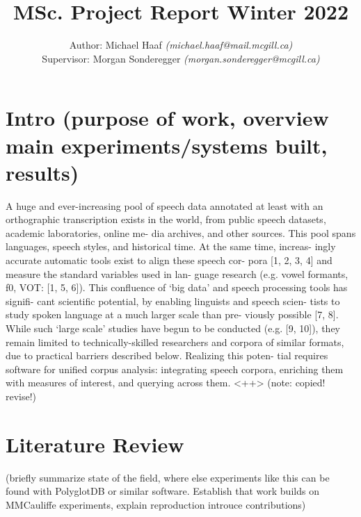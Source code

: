\documentclass[twoside,11pt]{article}
\begin{document}
\title{MSc. Project Report Winter 2022}
\author{Author: Michael Haaf \textit{(michael.haaf@mail.mcgill.ca)} \\ Supervisor: Morgan Sonderegger \textit{(morgan.sonderegger@mcgill.ca)}}

\maketitle


\section{Intro (purpose of work, overview main experiments/systems built, results)}

A huge and ever-increasing pool of speech data annotated at
least with an orthographic transcription exists in the world,
from public speech datasets, academic laboratories, online me-
dia archives, and other sources. This pool spans languages,
speech styles, and historical time. At the same time, increas-
ingly accurate automatic tools exist to align these speech cor-
pora [1, 2, 3, 4] and measure the standard variables used in lan-
guage research (e.g. vowel formants, f0, VOT: [1, 5, 6]). This
confluence of ‘big data’ and speech processing tools has signifi-
cant scientific potential, by enabling linguists and speech scien-
tists to study spoken language at a much larger scale than pre-
viously possible [7, 8]. While such ‘large scale’ studies have
begun to be conducted (e.g. [9, 10]), they remain limited to
technically-skilled researchers and corpora of similar formats,
due to practical barriers described below. Realizing this poten-
tial requires software for unified corpus analysis: integrating
speech corpora, enriching them with measures of interest, and
querying across them.
<++> (note: copied! revise!)

\section{Literature Review}

(briefly summarize state of the field, where else experiments like this can be found with PolyglotDB or similar software. Establish that work builds on MMCauliffe experiments, explain reproduction introuce contributions)
\end{document}
